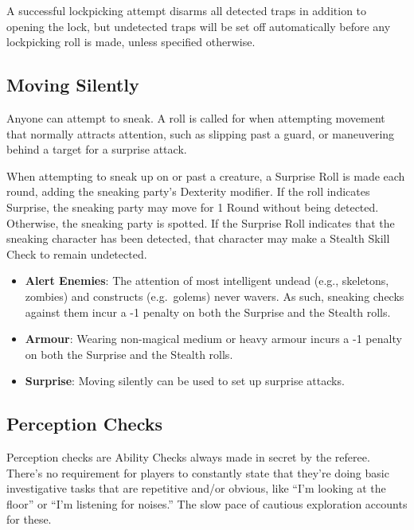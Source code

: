 \documentclass{book}
\providecommand{\tightlist}{%
\setlength{\itemsep}{0pt}\setlength{\parskip}{0pt}}
\begin{document}
A successful lockpicking attempt disarms all detected traps in addition
to opening the lock, but undetected traps will be set off automatically
before any lockpicking roll is made, unless specified otherwise.

\subsection*{Moving Silently}\label{moving-silently}

Anyone can attempt to sneak. A roll is called for when attempting
movement that normally attracts attention, such as slipping past a
guard, or maneuvering behind a target for a surprise attack.

When attempting to sneak up on or past a creature, a Surprise Roll is
made each round, adding the sneaking party's Dexterity modifier. If the
roll indicates Surprise, the sneaking party may move for 1 Round without
being detected. Otherwise, the sneaking party is spotted. If the
Surprise Roll indicates that the sneaking character has been detected,
that character may make a Stealth Skill Check to remain undetected.

\begin{itemize}
\tightlist
\item
  \textbf{Alert Enemies}: The attention of most intelligent undead
  (e.g., skeletons, zombies) and constructs (e.g.~golems) never wavers.
  As such, sneaking checks against them incur a -1 penalty on both the
  Surprise and the Stealth rolls.
\item
  \textbf{Armour}: Wearing non-magical medium or heavy armour incurs a
  -1 penalty on both the Surprise and the Stealth rolls.
\item
  \textbf{Surprise}: Moving silently can be used to set up surprise
  attacks.
\end{itemize}

\subsection*{Perception Checks}\label{perception-checks}

Perception checks are Ability Checks always made in secret by the
referee. There's no requirement for players to constantly state that
they're doing basic investigative tasks that are repetitive and/or
obvious, like ``I'm looking at the floor'' or ``I'm listening for
noises.'' The slow pace of cautious exploration accounts for these.
\end{document}
